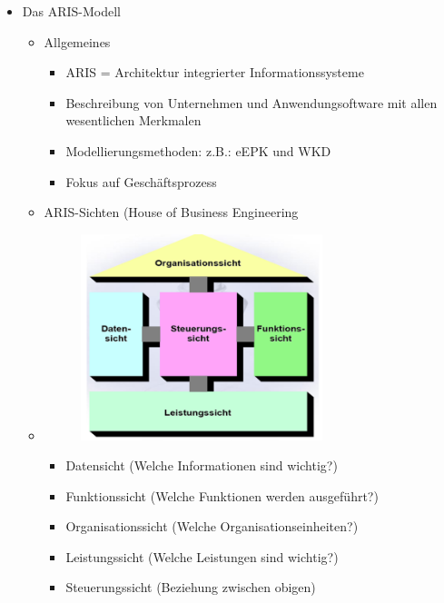 \documentclass[11pt,a4paper]{article}
\begin{document}
\begin{itemize}
	\item Das ARIS-Modell
		\begin{itemize}
		\item Allgemeines
			\begin{itemize}
			\item ARIS = Architektur integrierter Informationssysteme
			\item Beschreibung von Unternehmen und Anwendungsoftware mit allen wesentlichen Merkmalen
			\item Modellierungsmethoden: z.B.: eEPK und WKD 
			\item Fokus auf Geschäftsprozess
			\end{itemize}
		
		\item ARIS-Sichten (House of Business Engineering
		\item[] \begin{minipage}{0.35\textwidth}
				\begin{figure}[H]
				\includegraphics[height=6cm]{arishaus}
				
				\end{figure}
			\end{minipage}
			\begin{minipage}[t]{0.55\textwidth}
				\vspace{-1.5cm}
				\begin{itemize}
				\item Datensicht (Welche Informationen sind wichtig?)
				\item Funktionssicht (Welche Funktionen werden ausgeführt?)
				\item Organisationssicht (Welche Organisationseinheiten?)
				\item Leistungssicht (Welche Leistungen sind wichtig?)
				\item Steuerungssicht (Beziehung zwischen obigen)
				\end{itemize}
			\end{minipage}
			

\end{itemize}
\end{itemize}
\end{document}
